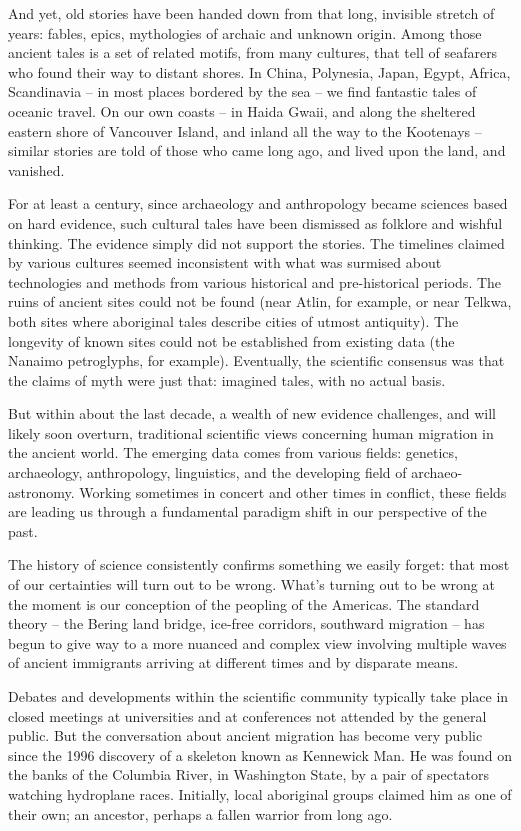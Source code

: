 \documentclass[10pt,DIV09,letterpaper,oneside,headsepline]{scrreprt}
\begin{document}
And yet, old stories have been handed down from that long, invisible
stretch of years: fables, epics, mythologies of archaic and unknown
origin. Among those ancient tales is a set of related motifs, from
many cultures, that tell of seafarers who found their way to distant
shores. In China, Polynesia, Japan, Egypt, Africa, Scandinavia -- in
most places bordered by the sea -- we find fantastic tales of oceanic
travel. On our own coasts -- in Haida Gwaii, and along the sheltered
eastern shore of Vancouver Island, and inland all the way to the
Kootenays -- similar stories are told of those who came long ago, and
lived upon the land, and vanished.

For at least a century, since archaeology and anthropology became
sciences based on hard evidence, such cultural tales have been
dismissed as folklore and wishful thinking. The evidence simply did
not support the stories. The timelines claimed by various cultures
seemed inconsistent with what was surmised about technologies and
methods from various historical and pre-historical periods. The ruins
of ancient sites could not be found (near Atlin, for example, or near
Telkwa, both sites where aboriginal tales describe cities of utmost
antiquity). The longevity of known sites could not be established from
existing data (the Nanaimo petroglyphs, for example). Eventually, the
scientific consensus was that the claims of myth were just that:
imagined tales, with no actual basis.

But within about the last decade, a wealth of new evidence challenges,
and will likely soon overturn, traditional scientific views concerning
human migration in the ancient world. The emerging data comes from
various fields: genetics, archaeology, anthropology, linguistics, and
the developing field of archaeo-astronomy. Working sometimes in
concert and other times in conflict, these fields are leading us
through a fundamental paradigm shift in our perspective of the past.

The history of science consistently confirms something we easily
forget: that most of our certainties will turn out to be wrong. What's
turning out to be wrong at the moment is our conception of the
peopling of the Americas. The standard theory -- the Bering land
bridge, ice-free corridors, southward migration -- has begun to give
way to a more nuanced and complex view involving multiple waves of
ancient immigrants arriving at different times and by disparate means.

Debates and developments within the scientific community typically
take place in closed meetings at universities and at conferences not
attended by the general public. But the conversation about ancient
migration has become very public since the 1996 discovery of a
skeleton known as Kennewick Man. He was found on the banks of the
Columbia River, in Washington State, by a pair of spectators watching
hydroplane races. Initially, local aboriginal groups claimed him as
one of their own; an ancestor, perhaps a fallen warrior from long ago.
\end{document}
